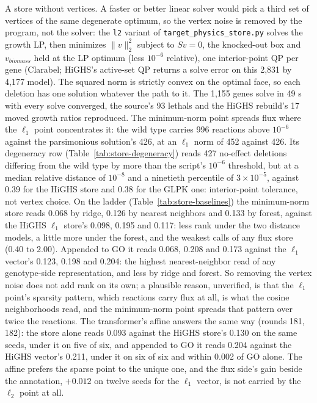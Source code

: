 A store without vertices. A faster or better linear solver would pick a third set of
vertices of the same degenerate optimum, so the vertex noise is removed by the program,
not the solver: the \texttt{l2} variant of \texttt{target\_physics\_store.py} solves
the growth LP, then minimizes $\|v\|_2^2$ subject to $Sv=0$, the knocked-out box and
$v_{biomass}$ held at the LP optimum (less $10^{-6}$ relative), one interior-point QP
per gene (Clarabel; HiGHS's active-set QP returns a solve error on this 2,831 by 4,177
model). The squared norm is strictly convex on the optimal face, so each deletion has
one solution whatever the path to it. The 1,155 genes solve in 49 s with every solve
converged, the source's 93 lethals and the HiGHS rebuild's 17 moved growth ratios
reproduced. The minimum-norm point spreads flux where the $\ell_1$ point concentrates
it: the wild type carries 996 reactions above $10^{-6}$ against the parsimonious
solution's 426, at an $\ell_1$ norm of 452 against 426. Its degeneracy row
(Table~\ref{tab:store-degeneracy}) reads 427 no-effect deletions differing from the
wild type by more than the script's $10^{-6}$ threshold, but at a median relative
distance of $10^{-8}$ and a ninetieth percentile of $3\times10^{-5}$, against 0.39 for
the HiGHS store and 0.38 for the GLPK one: interior-point tolerance, not vertex choice.
On the ladder (Table~\ref{tab:store-baselines}) the minimum-norm store reads 0.068 by
ridge, 0.126 by nearest neighbors and 0.133 by forest, against the HiGHS $\ell_1$
store's 0.098, 0.195 and 0.117: less rank under the two distance models, a little more
under the forest, and the weakest calls of any flux store (0.40 to 2.00). Appended to
GO it reads 0.068, 0.208 and 0.173 against the $\ell_1$ vector's 0.123, 0.198 and
0.204: the highest nearest-neighbor read of any genotype-side representation, and less
by ridge and forest. So removing the vertex noise does not add rank on its own; a
plausible reason, unverified, is that the $\ell_1$ point's sparsity pattern, which
reactions carry flux at all, is what the cosine neighborhoods read, and the
minimum-norm point spreads that pattern over twice the reactions. The transformer's
affine answers the same way (rounds 181, 182): the store alone reads 0.093 against the
HiGHS store's 0.130 on the same seeds, under it on five of six, and appended to GO it
reads 0.204 against the HiGHS vector's 0.211, under it on six of six and within 0.002
of GO alone. The affine prefers the sparse point to the unique one, and the flux side's
gain beside the annotation, $+0.012$ on twelve seeds for the $\ell_1$ vector, is not
carried by the $\ell_2$ point at all.

